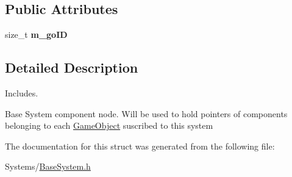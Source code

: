 \subsection*{Public Attributes}
\begin{DoxyCompactItemize}
\item 
\mbox{\label{structBaseSystemCompNode_a5aa946abaae775c0bf3d9388712ee4ef}} 
size\+\_\+t {\bfseries m\+\_\+go\+ID}
\end{DoxyCompactItemize}


\subsection{Detailed Description}
Includes. 

Base System component node. Will be used to hold pointers of components belonging to each \hyperlink{classGameObject}{Game\+Object} suscribed to this system 

The documentation for this struct was generated from the following file\+:\begin{DoxyCompactItemize}
\item 
Systems/\hyperlink{BaseSystem_8h}{Base\+System.\+h}\end{DoxyCompactItemize}

